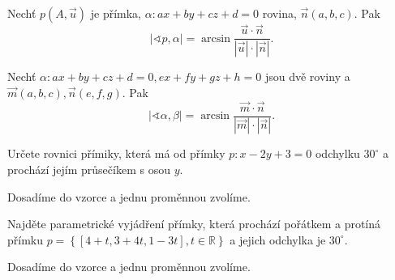 \begin{veta}
    Nechť $p(A,\vec u)$ je přímka, $\alpha:ax+by+cz+d=0$ rovina, $\vec n(a,b,c)$. Pak
    $$|\sphericalangle p, \alpha|=\arcsin \frac{\vec u \cdot \vec n}{|\vec u|\cdot |\vec n|}.$$
\end{veta}

\begin{veta}
    Nechť $\alpha:ax+by+cz+d=0, ex+fy+gz+h=0$ jsou dvě roviny a $\vec m(a,b,c), \vec n(e,f,g).$
    Pak
    $$|\sphericalangle \alpha, \beta|=\arcsin \frac{\vec m \cdot \vec n}{|\vec m|\cdot |\vec n|}.$$
\end{veta}

\begin{priklad}
Určete rovnici přímiky, která má od přímky $p:x-2y+3=0$ odchylku $30^\circ$ a prochází
jejím průsečíkem s osou $y$.
\end{priklad}

\begin{reseni}
Dosadíme do vzorce a jednu proměnnou zvolíme.
\end{reseni}

\begin{priklad}
Najděte parametrické vyjádření přímky, která prochází pořátkem a protíná přímku $p=\left \{ [4+t,3+4t,1-3t],t\in \mathbb R \right \} $
a jejich odchylka je $30^\circ$.
\end{priklad}

\begin{reseni}
Dosadíme do vzorce a jednu proměnnou zvolíme.
\end{reseni}
